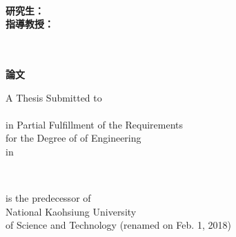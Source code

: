 
\begin{titlepage}
\vspace*{1mm}

\begin{center}

{\LARGE\bfseries  \titletw}\\
\vspace{15mm}
{\LARGE  \titleen}
\vspace{15mm}

{\large\bfseries{研究生：}\large\authortwname\\
\large\bfseries{指導教授：}\large\supervisortwname}

\vspace{15mm}
{\Large\bfseries{\schooltwname}\\
\vspace{4.5mm}
\Large\bfseries{}\\
\vspace{4.5mm}
\Large\bfseries \degreetw 論文}\\
\vspace{10mm}

\vspace{4.5mm}
A Thesis Submitted to \deptenname\\
\schoolenname\\
in Partial Fulfillment of the Requirements\\
for the Degree of \degreeen of Engineering\\
in \majortwname

\vspace{15mm}
\dateen\\
\schoolenlocation

\vspace{10mm}
\schoolenoldname is the predecessor of\\
National Kaohsiung University\\
of Science and Technology (renamed on Feb. 1, 2018)

\vspace{10mm}
\fontsize{14pt}{0pt}{\bfseries{\dateROC }}

\end{center}

\end{titlepage} 